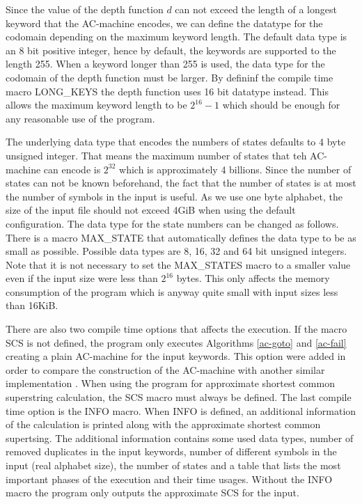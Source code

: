 \documentclass[english,twoside,censored,csm,algorithms-track-2020]{HYthesisML}
\theoremstyle{plain}
\theoremstyle{definition}
\begin{document}
Since the value of the depth function $d$ can not exceed the length of a longest keyword that the
AC-machine encodes, we can define the datatype for the codomain depending on the maximum keyword length.
The default data type is an 8 bit positive integer, hence by default, the keywords are supported to the
length 255. When a keyword longer than 255 is used, the data type for the codomain of the depth function
must be larger. By defininf the compile time macro LONG\_KEYS the depth function uses 16 bit datatype
instead. This allows the maximum keyword length to be $2^{16}-1$ which should be enough for any
reasonable use of the program.

The underlying data type that encodes the numbers of states defaults to 4 byte unsigned integer. That
means the maximum number of states that teh AC-machine can encode is $2^{32}$ which is approximately
4 billions. Since the number of states can not be known beforehand, the fact that the number of states
is at most the number of symbols in the input is useful. As we use one byte alphabet, the size
of the input file should not exceed 4GiB when using the default configuration. The data type
for the state numbers can be changed as follows. There is a macro MAX\_STATE that automatically
defines the data type to be as small as possible. Possible data types are 8, 16, 32 and 64 bit
unsigned integers. Note that it is not necessary to set the MAX\_STATES macro to a smaller value
even if the input size were less than $2^{16}$ bytes. This only affects the memory consumption of
the program which is anyway quite small with input sizes less than 16KiB.

There are also two compile time options that affects the execution. If the macro SCS is not defined,
the program only executes Algorithms \ref{ac-goto} and \ref{ac-fail} creating a plain AC-machine
for the input keywords. This option were added in order to compare the construction of the
AC-machine with another similar implementation \citep{Salmela}. When using the program for approximate
shortest common superstring calculation, the SCS macro must always be defined. The last compile
time option is the INFO macro. When INFO is defined, an additional information of the calculation
is printed along with the approximate shortest common supertsing. The additional information contains
some used data types, number of removed duplicates in the input keywords, number of different symbols
in the input (real alphabet size), the number of states and a table that lists the most important
phases of the execution and their time usages. Without the INFO macro the program only outputs
the approximate SCS for the input.
\end{document}

